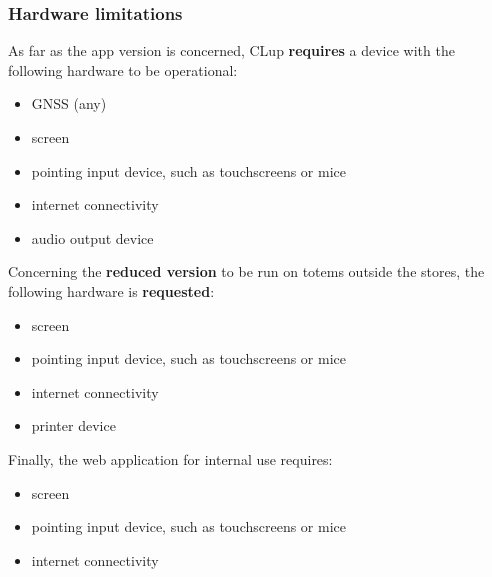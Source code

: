 \subsubsection{Hardware limitations \label{subsub:hwLimit}}

As far as the app version is concerned, CLup \textbf{requires} a device with the following hardware to be operational:\newline
\begin{itemize}
    \item GNSS (any)
    \item screen
    \item pointing input device, such as touchscreens or mice
    \item internet connectivity
    \item audio output device
\end{itemize}

\bigskip \noindent Concerning the \textbf{reduced version} to be run on totems outside the stores, the following hardware is \textbf{requested}:\newline
\begin{itemize}
    \item screen
    \item pointing input device, such as touchscreens or mice
    \item internet connectivity
    \item printer device
\end{itemize}

\bigskip \noindent Finally, the web application for internal use requires: \newline
\begin{itemize}
    \item screen
    \item pointing input device, such as touchscreens or mice
    \item internet connectivity
\end{itemize}

